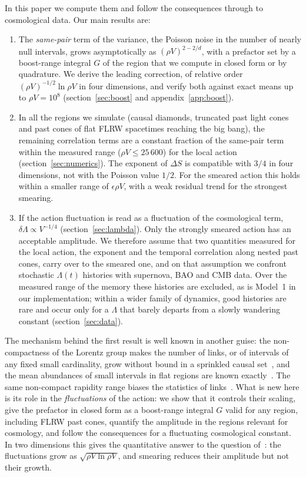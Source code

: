 \documentclass{iopjournal}
\newcommand{\rhoV}{\rho V}
\begin{document}
In this paper we compute them and follow the consequences through to
cosmological data. Our main results are:
\begin{enumerate}
\item The \emph{same-pair} term of the variance, the Poisson noise in the
number of nearly null intervals, grows asymptotically as $(\rhoV)^{2-2/d}$,
with a prefactor set by a boost-range integral $G$ of the region that we
compute in closed form or by quadrature. We derive the leading correction,
of relative order $(\rhoV)^{-1/2}\ln\rhoV$ in four dimensions, and verify both
against exact means up to $\rhoV=10^8$ (section~\ref{sec:boost} and
appendix~\ref{app:boost}).
\item In all the regions we simulate (causal diamonds, truncated past light
cones and past cones of flat FLRW spacetimes reaching the big bang), the
remaining correlation terms are a constant fraction of the same-pair term
within the measured range ($\rhoV\le25\,600$) for the local action
(section~\ref{sec:numerics}). The exponent of $\Delta S$ is compatible
with $3/4$ in four dimensions, not with the Poisson value $1/2$.
For the smeared action this holds within a smaller range of $\epsilon\rhoV$,
with a weak residual trend for the strongest smearing.
\item If the action fluctuation is read as a fluctuation of the cosmological
term, $\delta\Lambda\propto V^{-1/4}$ (section~\ref{sec:lambda}). Only the
strongly smeared action has an acceptable amplitude. We therefore assume that
two quantities measured for the local action, the exponent and the temporal
correlation along nested past cones, carry over to the smeared one, and on
that assumption we confront stochastic $\Lambda(t)$ histories with supernova,
BAO and CMB data. Over the measured range of the memory these histories are
excluded, as is Model~1 in our implementation; within a wider family of
dynamics, good histories are rare and occur only for a $\Lambda$ that barely
departs from a slowly wandering constant (section~\ref{sec:data}).
\end{enumerate}
The mechanism behind the first result is well known in another guise: the
non-compactness of the Lorentz group makes the number of links, or of
intervals of any fixed small cardinality, grow without bound in a sprinkled
causal set~\cite{Bombelli2009}, and the mean abundances of small intervals in
flat regions are known exactly~\cite{Glaser2013}. The same non-compact
rapidity range biases the statistics of links~\cite{Boguna2026}. What is new
here is its role in the \emph{fluctuations} of the action: we show that it
controls their scaling, give the prefactor in closed form as a boost-range
integral $G$ valid for any region, including FLRW past cones, quantify the
amplitude in the regions relevant for cosmology, and follow the consequences
for a fluctuating cosmological constant. In two dimensions this gives the
quantitative answer to the question of~\cite{Benincasa2011}: the fluctuations
grow as $\sqrt{\rhoV\ln\rhoV}$, and smearing reduces their amplitude but not
their growth.
\end{document}
